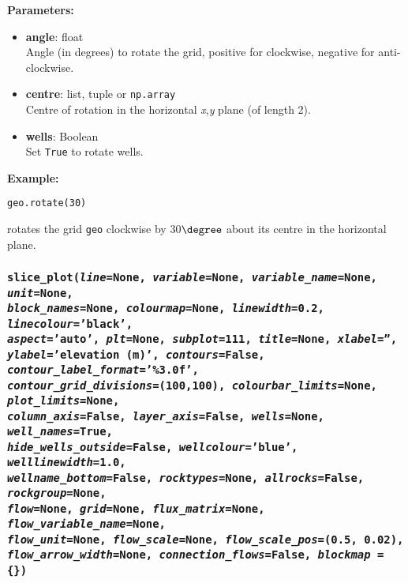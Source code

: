 \textbf{Parameters:}
\begin{itemize}
  \item \textbf{angle}: float\\
    Angle (in degrees) to rotate the grid, positive for clockwise, negative for anti-clockwise.
  \item \textbf{centre}: list, tuple or \texttt{np.array}\\
    Centre of rotation in the horizontal \emph{x},\emph{y} plane (of length 2).
  \item \textbf{wells}: Boolean\\
    Set \texttt{True} to rotate wells.
\end{itemize}

\textbf{Example:}

\begin{lstlisting}
geo.rotate(30)
\end{lstlisting}

rotates the grid \texttt{geo} clockwise by 30$\degree$ about its centre in the horizontal plane.

\begin{snugshade}
\subsubsection{\texttt{slice\_plot(\emph{line}=None, \emph{variable}=None, \emph{variable\_name}=None, \emph{unit}=None,\\
    \emph{block\_names}=None, \emph{colourmap}=None, \emph{linewidth}=0.2, \emph{linecolour}='black',\\
    \emph{aspect}='auto', \emph{plt}=None, \emph{subplot}=111, \emph{title}=None, \emph{xlabel}='',\\
    \emph{ylabel}='elevation (m)', \emph{contours}=False, \emph{contour\_label\_format}='\%3.0f',\\
    \emph{contour\_grid\_divisions}=(100,100), \emph{colourbar\_limits}=None, \emph{plot\_limits}=None,\\
    \emph{column\_axis}=False, \emph{layer\_axis}=False, \emph{wells}=None, \emph{well\_names}=True,\\
    \emph{hide\_wells\_outside}=False, \emph{wellcolour}='blue', \emph{welllinewidth}=1.0,\\
    \emph{wellname\_bottom}=False, \emph{rocktypes}=None, \emph{allrocks}=False, \emph{rockgroup}=None,\\
    \emph{flow}=None, \emph{grid}=None, \emph{flux\_matrix}=None, \emph{flow\_variable\_name}=None,\\
    \emph{flow\_unit}=None, \emph{flow\_scale}=None, \emph{flow\_scale\_pos}=(0.5, 0.02),\\
    \emph{flow\_arrow\_width}=None, \emph{connection\_flows}=False, \emph{blockmap} = \{\})}}
\end{snugshade}
\label{sec:mulgrid:slice_plot}

